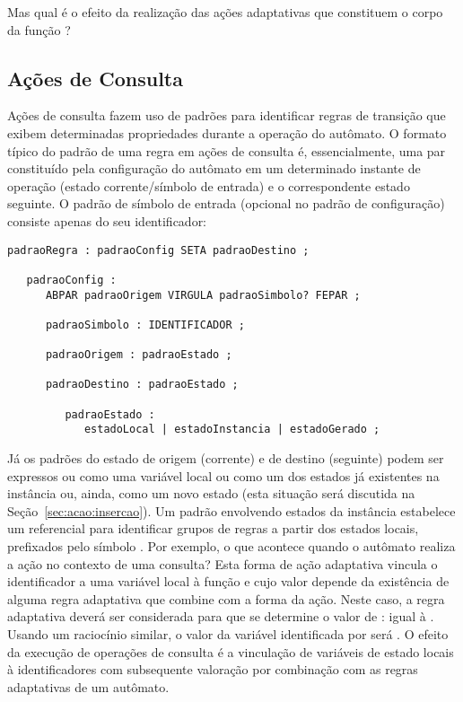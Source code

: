 Mas qual é o efeito da realização das ações adaptativas que constituem o corpo da função ?

\subsection*{Ações de Consulta}

Ações de consulta fazem uso de padrões para identificar regras de transição que exibem determinadas propriedades durante a operação do autômato. O formato típico do padrão de uma regra em ações de consulta é, essencialmente, uma par constituído pela configuração do autômato em um determinado instante de operação (estado corrente/símbolo de entrada) e o correspondente estado seguinte. O padrão de símbolo de entrada (opcional no padrão de configuração) consiste apenas do seu identificador:

\begin{lstlisting}[style=antlr]
padraoRegra : padraoConfig SETA padraoDestino ;

   padraoConfig :
      ABPAR padraoOrigem VIRGULA padraoSimbolo? FEPAR ;

      padraoSimbolo : IDENTIFICADOR ;

      padraoOrigem : padraoEstado ;

      padraoDestino : padraoEstado ;

         padraoEstado :
            estadoLocal | estadoInstancia | estadoGerado ;
\end{lstlisting}

\noindent
Já os padrões do estado de origem (corrente) e de destino (seguinte) podem ser expressos ou como uma variável local ou como um dos estados já existentes na instância ou, ainda, como um novo estado (esta situação será discutida na Seção~\ref{sec:acao:insercao}). Um padrão envolvendo estados da instância estabelece um referencial para identificar grupos de regras a partir dos estados locais, prefixados pelo símbolo . Por exemplo, o que acontece quando o autômato  realiza a ação  no contexto de uma consulta? Esta forma de ação adaptativa vincula o identificador  a uma variável local à função e cujo valor depende da existência de alguma regra adaptativa que combine com a forma da ação. Neste caso, a regra adaptativa  deverá ser considerada para que se determine o valor de : igual à . Usando um raciocínio similar, o valor da variável identificada por  será . O efeito da execução de operações de consulta é a vinculação de variáveis de estado locais à identificadores com subsequente valoração por combinação com as regras adaptativas de um autômato.

